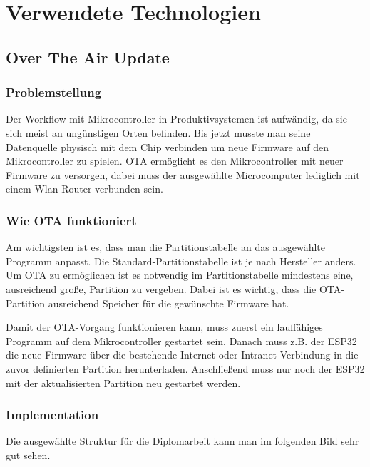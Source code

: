 \chapter{Verwendete Technologien}\label{cha:used-technologies}

\section{Over The Air Update}\label{sec:ota}

\subsection*{Problemstellung}\label{sec:problem}
Der Workflow mit Mikrocontroller in Produktivsystemen ist aufwändig, da sie sich meist an ungünstigen Orten befinden. 
Bis jetzt musste man seine Datenquelle physisch mit dem Chip verbinden um neue Firmware auf den Mikrocontroller zu spielen. 
OTA ermöglicht es den Mikrocontroller mit neuer Firmware zu versorgen, dabei muss der ausgewählte Microcomputer lediglich mit einem Wlan-Router verbunden sein. 

\subsection*{Wie OTA funktioniert}
Am wichtigsten ist es, dass man die Partitionstabelle an das ausgewählte Programm anpasst. 
Die Standard-Partitionstabelle ist je nach Hersteller anders. Um OTA zu ermöglichen ist es notwendig im Partitionstabelle mindestens eine, ausreichend große, Partition zu vergeben. Dabei ist es wichtig, dass die OTA-Partition ausreichend Speicher für die gewünschte Firmware hat.

Damit der OTA-Vorgang funktionieren kann, muss zuerst ein lauffähiges Programm auf dem Mikrocontroller gestartet sein. Danach muss z.B. der ESP32 die neue Firmware über die bestehende Internet oder Intranet-Verbindung in die zuvor definierten Partition herunterladen. Anschließend muss nur noch der ESP32 mit der aktualisierten Partition neu gestartet werden. 

\subsection*{Implementation}
Die ausgewählte Struktur für die Diplomarbeit kann man im folgenden Bild sehr gut sehen.

